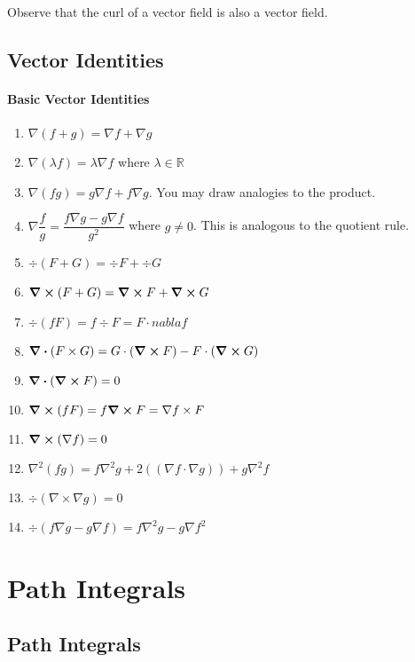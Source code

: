 \documentclass[12pt, letterpaper]{article}
\begin{document}
    Observe that the curl of a vector field is also a vector field.

    \subsection{Vector Identities}
    
    
    \paragraph{Basic Vector Identities}
    
    \begin{enumerate}
        \item \(\nabla(f + g) = \nabla f + \nabla g\)
        \item \(\nabla (\lambda f) = \lambda \nabla f\) where \(\lambda \in \mathbb{R}\)
        \item \(\nabla (fg) = g \nabla f + f \nabla g\). You may draw analogies to the product.
        \item \(\nabla \dfrac{f}{g} = \dfrac{f\nabla g - g\nabla f}{g^2}\) where \(g\neq 0\). This is analogous to the quotient rule.
        \item \(\div (F + G) = \div F + \div G\)
        \item \(\curl (F + G) = \curl F + \curl G\)
        \item \(\div (fF) = f\div F = F\cdot nabla f\)
        \item \(\div (F\times G) = G \cdot (\curl F) - F \cdot (\curl G)\)
        \item \(\div(\curl F) = 0\)
        \item \(\curl (fF) = f\curl F = \nabla f \times F\)
        \item  \(\curl (\nabla f) = 0\)
        \item \(\nabla^2 (fg) = f\nabla^2 g + 2((\nabla f \cdot \nabla g)) + g\nabla^2f\)
        \item \(\div (\nabla \times \nabla g) = 0\)
        \item \(\div(f\nabla g - g\nabla f) = f\nabla^2 g - g\nabla f^2\)
    \end{enumerate}


    \section{Path Integrals}

    \subsection{Path Integrals}
\end{document}
